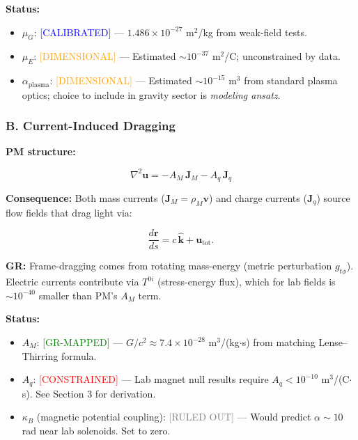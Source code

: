 \documentclass{article}
\begin{document}
\textbf{Status:}

\begin{itemize}
    \item $\mu_G$: \textcolor{blue}{[CALIBRATED]} --- $1.486 \times 10^{-27}$ m$^2$/kg from weak-field tests.
    \item $\mu_E$: \textcolor{orange}{[DIMENSIONAL]} --- Estimated $\sim 10^{-37}$ m$^2$/C; unconstrained by data.
    \item $\alpha_{\text{plasma}}$: \textcolor{orange}{[DIMENSIONAL]} --- Estimated $\sim 10^{-15}$ m$^3$ from standard plasma optics; choice to include in gravity sector is \emph{modeling ansatz}.
\end{itemize}

\subsubsection*{B. Current-Induced Dragging}

\textbf{PM structure:}



\[
\nabla^2 \mathbf u = -A_M\,\mathbf J_M - A_q\,\mathbf J_q
\]



\textbf{Consequence:} Both mass currents ($\mathbf J_M = \rho_M \mathbf v$) and
charge currents ($\mathbf J_q$) source flow fields that drag light via:



\[
\frac{d\mathbf r}{ds} = c\,\hat{\mathbf k} + \mathbf u_{\text{tot}}.
\]



\textbf{GR:} Frame-dragging comes from rotating mass-energy (metric perturbation
$g_{t\phi}$). Electric currents contribute via $T^{0i}$ (stress-energy flux),
which for lab fields is $\sim 10^{-40}$ smaller than PM's $A_M$ term.

\textbf{Status:}

\begin{itemize}
    \item $A_M$: \textcolor{green}{[GR-MAPPED]} --- $G/c^2 \approx 7.4 \times 10^{-28}$ m$^3$/(kg$\cdot$s) from matching Lense--Thirring formula.
    \item $A_q$: \textcolor{red}{[CONSTRAINED]} --- Lab magnet null results require $A_q < 10^{-10}$ m$^3$/(C$\cdot$s). See Section 3 for derivation.
    \item $\kappa_B$ (magnetic potential coupling): \textcolor{gray}{[RULED OUT]} --- Would predict $\alpha \sim 10$ rad near lab solenoids. Set to zero.
\end{itemize}
\end{document}

